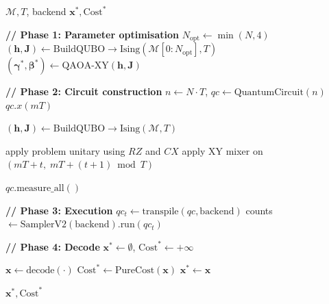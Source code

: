 \begin{appendices}
\begin{algorithm}[H]
\begin{algorithmic}[1]
\Require $\mathcal{M}, T$, backend
\Ensure $\mathbf{x}^*, \text{Cost}^*$

\Statex \textbf{// Phase 1: Parameter optimisation}
\State $N_{\text{opt}} \gets \min(N,4)$
\State $(\mathbf{h}, \mathbf{J}) \gets \text{BuildQUBO} \rightarrow \text{Ising}(\mathcal{M}[0:N_{\text{opt}}], T)$
\State $(\boldsymbol{\gamma}^*, \boldsymbol{\beta}^*) \gets \text{QAOA-XY}(\mathbf{h}, \mathbf{J})$

\Statex \textbf{// Phase 2: Circuit construction}
\State $n \gets N \cdot T$, \quad $qc \gets \text{QuantumCircuit}(n)$
    \State $qc.x(mT)$
\EndFor

\State $(\mathbf{h}, \mathbf{J}) \gets \text{BuildQUBO} \rightarrow \text{Ising}(\mathcal{M}, T)$

    \State apply problem unitary using $RZ$ and $CX$
            \State apply XY mixer on $(mT+t,\; mT+(t+1)\bmod T)$
        \EndFor
    \EndFor
\EndFor

\State $qc.\text{measure\_all}()$

\Statex \textbf{// Phase 3: Execution}
\State $qc_t \gets \text{transpile}(qc,\text{backend})$
\State counts $\gets \text{SamplerV2}(\text{backend}).\text{run}(qc_t)$

\Statex \textbf{// Phase 4: Decode}
\State $\mathbf{x}^* \gets \emptyset$, \quad $\text{Cost}^* \gets +\infty$

    \State $\mathbf{x} \gets \text{decode}(\cdot)$
        \State $\text{Cost}^* \gets \text{PureCost}(\mathbf{x})$
        \State $\mathbf{x}^* \gets \mathbf{x}$
    \EndIf
\EndFor

\State \Return $\mathbf{x}^*, \text{Cost}^*$

\end{algorithmic}
\end{algorithm}

\end{appendices}
